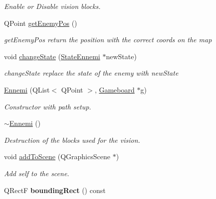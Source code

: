\begin{DoxyCompactItemize}
\begin{DoxyCompactList}\small\item\em Enable or Disable vision blocks. \end{DoxyCompactList}\item 
Q\+Point \hyperlink{class_ennemi_a14529c0dc2ad2edf3b5d174221ffa6ff}{get\+Enemy\+Pos} ()
\begin{DoxyCompactList}\small\item\em get\+Enemy\+Pos return the position with the correct coords on the map \end{DoxyCompactList}\item 
void \hyperlink{class_ennemi_a3d8cf7a7d4b577a46cfdfaa1f37e9ded}{change\+State} (\hyperlink{class_state_ennemi}{State\+Ennemi} $\ast$new\+State)
\begin{DoxyCompactList}\small\item\em change\+State replace the state of the enemy with new\+State \end{DoxyCompactList}\item 
\hyperlink{class_ennemi_af86e9134a1cfd8d878305924702b9d7a}{Ennemi} (Q\+List$<$ Q\+Point $>$, \hyperlink{class_gameboard}{Gameboard} $\ast$g)
\begin{DoxyCompactList}\small\item\em Constructor with path setup. \end{DoxyCompactList}\item 
\hypertarget{class_ennemi_adf402a9389efe705c604f91d6e74d00e}{}\hyperlink{class_ennemi_adf402a9389efe705c604f91d6e74d00e}{$\sim$\+Ennemi} ()\label{class_ennemi_adf402a9389efe705c604f91d6e74d00e}

\begin{DoxyCompactList}\small\item\em Destruction of the blocks used for the vision. \end{DoxyCompactList}\item 
\hypertarget{class_ennemi_ae62d1dcf274319710e7ac4495c95a221}{}void \hyperlink{class_ennemi_ae62d1dcf274319710e7ac4495c95a221}{add\+To\+Scene} (Q\+Graphics\+Scene $\ast$)\label{class_ennemi_ae62d1dcf274319710e7ac4495c95a221}

\begin{DoxyCompactList}\small\item\em Add self to the scene. \end{DoxyCompactList}\item 
\hypertarget{class_ennemi_aa00ff90bbb5d71456a23673e77c41bb4}{}Q\+Rect\+F {\bfseries bounding\+Rect} () const \label{class_ennemi_aa00ff90bbb5d71456a23673e77c41bb4}


\end{DoxyCompactItemize}
